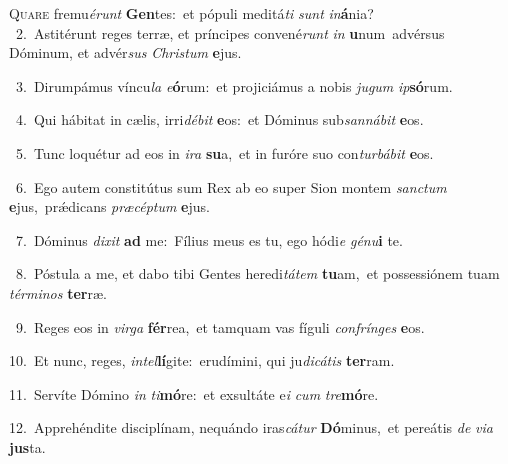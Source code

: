 \lettrine{\initial\textcolor{\initialcolor}{Q}}{uare} fremu\-\textit{é}\-\textit{runt} \textbf{Gen}\-tes:~\star et pópuli meditá\textit{ti} \textit{sunt} \textit{in}\-\textbf{á}nia?\\
{\numbfont\textcolor{\numbcolor}{~2.}}~Astitérunt reges terræ, et príncipes convené\textit{runt} \textit{in} \textbf{u}\-num~\star advérsus Dóminum, et advér\textit{sus} \textit{Chris}\-\textit{tum} \textbf{e}\-jus.\par
{\numbfont\textcolor{\numbcolor}{~3.}}~Dirumpámus víncu\textit{la} \textit{e}\-\textbf{ó}rum:~\star et projiciámus a nobis \textit{ju}\-\textit{gum} \textit{ip}\-\textbf{só}rum.\par
{\numbfont\textcolor{\numbcolor}{~4.}}~Qui hábitat in cælis, irri\-\textit{dé}\-\textit{bit} \textbf{e}\-os:~\star et Dóminus sub\-\textit{san}\-\textit{ná}\textit{bit} \textbf{e}\-os.\par
{\numbfont\textcolor{\numbcolor}{~5.}}~Tunc loquétur ad eos in \textit{i}\-\textit{ra} \textbf{su}\-a,~\star et in furóre suo con\-\textit{tur}\-\textit{bá}\textit{bit} \textbf{e}\-os.\par
{\numbfont\textcolor{\numbcolor}{~6.}}~Ego autem constitútus sum Rex ab eo super Sion montem \textit{sanc}\-\textit{tum} \textbf{e}\-jus,~\star prǽdicans \textit{præ}\-\textit{cép}\textit{tum} \textbf{e}\-jus.\par
{\numbfont\textcolor{\numbcolor}{~7.}}~Dóminus \textit{di}\-\textit{xit} \textbf{ad} me:~\star Fílius meus es tu, ego hódi\textit{e} \textit{gé}\-\textit{nu}\textbf{i} te.\par
{\numbfont\textcolor{\numbcolor}{~8.}}~Póstula a me, et dabo tibi Gentes heredi\-\textit{tá}\-\textit{tem} \textbf{tu}\-am,~\star et possessiónem tuam \textit{tér}\-\textit{mi}\textit{nos} \textbf{ter}\-ræ.\par
{\numbfont\textcolor{\numbcolor}{~9.}}~Reges eos in \textit{vir}\-\textit{ga} \textbf{fér}\-rea,~\star et tamquam vas fíguli \textit{con}\-\textit{frín}\textit{ges} \textbf{e}\-os.\par
{\numbfont\textcolor{\numbcolor}{10.}}~Et nunc, reges, \textit{in}\-\textit{tel}\textbf{lí}gite:~\star erudímini, qui ju\-\textit{di}\-\textit{cá}\textit{tis} \textbf{ter}\-ram.\par
{\numbfont\textcolor{\numbcolor}{11.}}~Servíte Dómino \textit{in} \textit{ti}\-\textbf{mó}re:~\star et exsultáte e\textit{i} \textit{cum} \textit{tre}\-\textbf{mó}re.\par
{\numbfont\textcolor{\numbcolor}{12.}}~Apprehéndite disciplínam, nequándo iras\-\textit{cá}\-\textit{tur} \textbf{Dó}\-minus,~\star et pereátis \textit{de} \textit{vi}\-\textit{a} \textbf{jus}\-ta.\par
